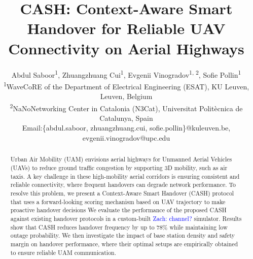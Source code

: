 \documentclass[conference]{IEEEtran}
\newcommand*\zc[1]{\textcolor{blue}{Zach: #1}}
\begin{document}
\title{ CASH: Context-Aware Smart Handover for Reliable UAV Connectivity on Aerial Highways
}

\author{Abdul Saboor\textsuperscript{1},
         Zhuangzhuang Cui\textsuperscript{1},
        Evgenii Vinogradov\textsuperscript{1, 2},
        Sofie Pollin\textsuperscript{1}
\\\textsuperscript{1}WaveCoRE of the Department of Electrical Engineering (ESAT), KU Leuven, Leuven, Belgium
\\\textsuperscript{2}NaNoNetworking Center in Catalonia (N3Cat), Universitat Polit\`{e}cnica de Catalunya, Spain
\\Email:\{abdul.saboor, zhuangzhuang.cui, sofie.pollin\}@kuleuven.be, evgenii.vinogradov@upc.edu}

\maketitle

\begin{abstract}
Urban Air Mobility (UAM) envisions aerial highways for Unmanned Aerial Vehicles (UAVs) to reduce ground traffic congestion by supporting 3D mobility, such as air taxis. A key challenge in these high-mobility aerial corridors is ensuring consistent and reliable connectivity, where frequent handovers can degrade network performance. To resolve this problem, we present a Context-Aware Smart Handover (CASH) protocol that uses a forward-looking scoring mechanism based on UAV trajectory to make proactive handover decisions %
We evaluate the performance of the proposed CASH against existing handover protocols in a custom-built \zc{channel?} simulator. Results show that CASH reduces handover frequency by up to 78\% while maintaining low outage probability. We then investigate the impact of base station density and safety margin on handover performance, where their optimal setups are empirically obtained to ensure reliable UAM communication.

\end{abstract}
\end{document}
